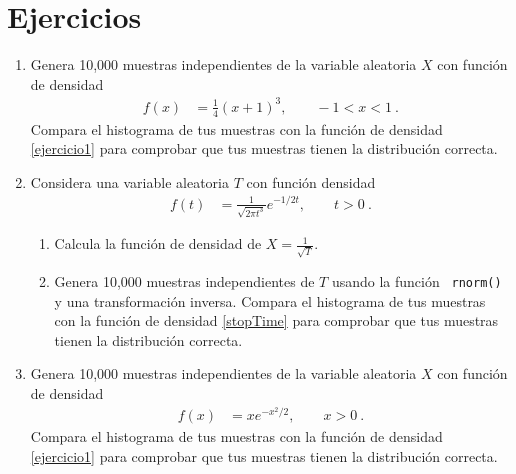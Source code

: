 \documentclass[12pt,reqno]{amsart}\usepackage[]{graphicx}\usepackage[]{color}
\begin{document}
\section{Ejercicios}
\begin{enumerate}
\item Genera 10,000 muestras independientes de la variable aleatoria $X$ con función de densidad
\begin{equation}\label{ejercicio1}
  \begin{split}
  f(x) &= \frac{1}{4}(x+1)^3,\qquad -1 < x < 1\:.
  \end{split}
\end{equation}
Compara el histograma de tus muestras con la función de densidad \eqref{ejercicio1} para comprobar que tus muestras tienen la distribución correcta.
\item Considera una variable aleatoria $T$ con función densidad
\begin{equation}\label{stopTime}
  \begin{split}
  f(t) &= \frac{1}{\sqrt{2\pi t^3}} e^{-1/2t},\qquad t>0\:.
  \end{split}
\end{equation}
\begin{enumerate}
\item Calcula la función de densidad de $X=\frac{1}{\sqrt{T}}$.
\item Genera 10,000 muestras independientes de $T$ usando la función \verb+ rnorm()+ y una transformación inversa. Compara el histograma de tus muestras con la función de densidad \eqref{stopTime} para comprobar que tus muestras tienen la distribución correcta.
\end{enumerate}

\item Genera 10,000 muestras independientes de la variable aleatoria $X$ con función de densidad
\begin{equation}\label{ejercicio3}
  \begin{split}
  f(x) &= x e^{-x^2/2}, \qquad x > 0\:.
  \end{split}
\end{equation}
Compara el histograma de tus muestras con la función de densidad \eqref{ejercicio1} para comprobar que tus muestras tienen la distribución correcta.

\end{enumerate}
\end{document}
